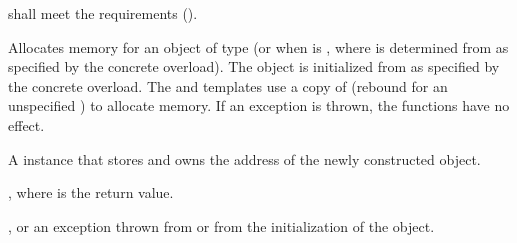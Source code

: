 \begin{itemdescr}
\pnum
\requires {} shall meet the 
requirements ().

\pnum
\effects
Allocates memory for an object of type 
(or  when  is ,
where  is determined from  as specified by the concrete overload).
The object is initialized from  as specified by the concrete overload.
The  and  templates
use a copy of 
(rebound for an unspecified ) to allocate memory.
If an exception is thrown, the functions have no effect.

\pnum
\returns
A  instance that stores and owns the address of
the newly constructed object.

\pnum
\ensures
{},
where  is the return value.

\pnum
\throws
{}, or
an exception thrown from  or from the initialization of the object.


\end{itemdescr}
